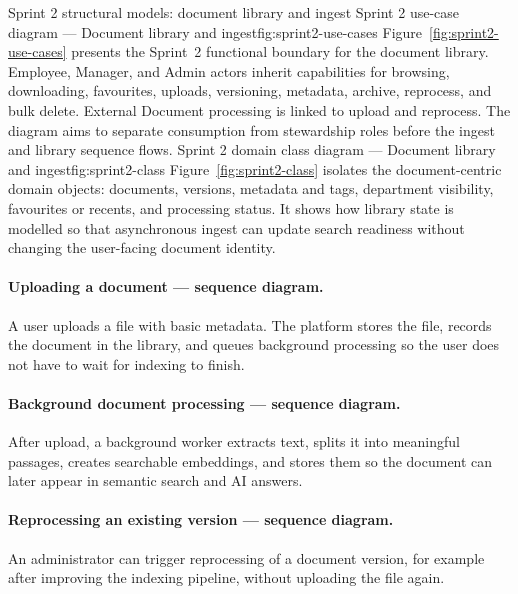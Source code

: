 %
  {Sprint 2 structural models: document library and ingest}%
  {Sprint 2 use-case diagram — Document library and ingest}{fig:sprint2-use-cases}%
  {Figure~\ref{fig:sprint2-use-cases} presents the Sprint~2 functional boundary
  for the document library. Employee, Manager, and Admin actors inherit
  capabilities for browsing, downloading, favourites, uploads, versioning,
  metadata, archive, reprocess, and bulk delete. External Document processing
  is linked to upload and reprocess. The diagram aims to separate consumption
  from stewardship roles before the ingest and library sequence flows.}%
  {Sprint 2 domain class diagram — Document library and ingest}{fig:sprint2-class}%
  {Figure~\ref{fig:sprint2-class} isolates the document-centric domain objects:
  documents, versions, metadata and tags, department visibility, favourites or
  recents, and processing status. It shows how library state is modelled so that
  asynchronous ingest can update search readiness without changing the user-facing
  document identity.}%



\paragraph{Uploading a document --- sequence diagram.}
A user uploads a file with basic metadata. The platform stores the file, records
the document in the library, and queues background processing so the user does
not have to wait for indexing to finish.

\paragraph{Background document processing --- sequence diagram.}
After upload, a background worker extracts text, splits it into meaningful
passages, creates searchable embeddings, and stores them so the document can
later appear in semantic search and AI answers.

\paragraph{Reprocessing an existing version --- sequence diagram.}
An administrator can trigger reprocessing of a document version, for example
after improving the indexing pipeline, without uploading the file again.

